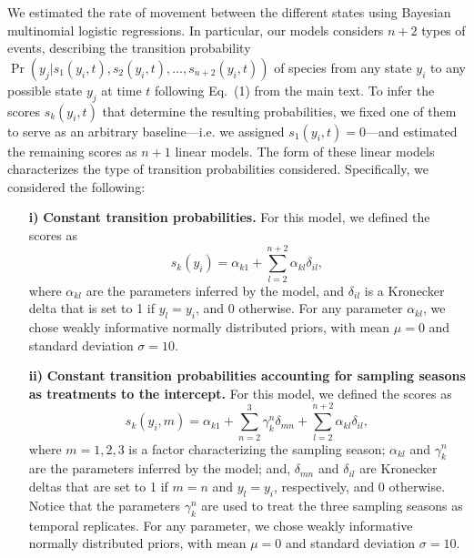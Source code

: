 \documentclass[11pt, a4paper]{article}
\begin{document}
We estimated the rate of movement between the different states using Bayesian multinomial logistic regressions. In particular, our models considers $n+2$ types of events, describing the transition probability $\Pr\left(y_j|s_1\left(y_i,t\right), s_2\left(y_i,t\right),\ldots,s_{n+2}\left(y_i,t\right)\right)$ of species from any state $y_i$ to any possible state $y_j$ at time $t$ following Eq.~(1) from the main text. To infer the scores $s_k\left(y_i,t\right)$ that determine the resulting probabilities, we fixed one of them to serve as an arbitrary baseline---i.e.\,\,we assigned $s_1\left(y_i,t\right)=0$---and estimated the remaining scores as $n+1$ linear models. The form of these linear models characterizes the type of transition probabilities considered. Specifically, we considered the following:
\begin{itemize}
\item[\textbf{i)}] \textbf{Constant transition probabilities.} For this model, we defined the scores as
\begin{equation}
s_k\left(y_i\right)=\alpha_{k1} + \sum_{l=2}^{n+2} \alpha_{kl}\delta_{il},
\end{equation}
where $\alpha_{kl}$ are the parameters inferred by the model, and $\delta_{il}$ is a Kronecker delta that is set to 1 if $y_l=y_i$, and 0 otherwise. For any parameter $\alpha_{kl}$, we chose weakly informative normally distributed priors, with mean $\mu=0$ and standard deviation $\sigma=10$.

\item[\textbf{ii)}] \textbf{Constant transition probabilities accounting for sampling seasons as treatments to the intercept.} For this model, we defined the scores as
\begin{equation}
s_k\left(y_i, m\right)=\alpha_{k1} + \sum_{n=2}^{3} \gamma_{k}^n\delta_{mn} + \sum_{l=2}^{n+2} \alpha_{kl}\delta_{il},
\end{equation}
where $m={1,2,3}$ is a factor characterizing the sampling season; $\alpha_{kl}$ and $\gamma_{k}^n$ are the parameters inferred by the model; and, $\delta_{mn}$ and $\delta_{il}$ are Kronecker deltas that are set to 1 if $m=n$ and $y_l=y_i$, respectively, and 0 otherwise. Notice that the parameters $\gamma_{k}^n$ are used to treat the three sampling seasons as temporal replicates. For any parameter, we chose weakly informative normally distributed priors, with mean $\mu=0$ and standard deviation $\sigma=10$.


\end{itemize}
\end{document}
